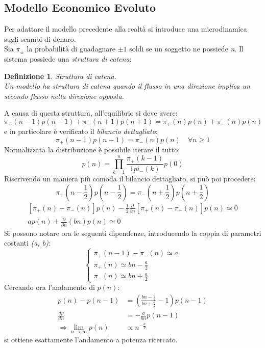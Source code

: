 \documentclass[12pt, a4paper]{article}
\theoremstyle{theorem}
\newtheorem{definition}{Definizione}[section]
\begin{document}
		\subsection{Modello Economico Evoluto}
			Per adattare il modello precedente alla realtà si introduce una microdinamica sugli scambi di denaro.\\
			Sia $\pi_\pm$ la probabilità di guadagnare $\pm 1$ soldi se un soggetto ne possiede \textit{n}. Il sistema possiede una \textit{struttura di catena}:
			\begin{definition}
				Struttura di catena.\\
				Un modello ha struttura di catena quando il flusso in una direzione implica un secondo flusso nella direzione opposta.
			\end{definition}
			A causa di questa struttura, all'equilibrio si deve avere:
			\begin{equation}
				\pi_+(n-1)p(n-1)+\pi_-(n+1)p(n+1)=\pi_+(n)p(n)+\pi_-(n)p(n)
			\end{equation}
			e in particolare è verificato il \textit{bilancio dettagliato}:
			\begin{equation}
				\pi_+(n-1)p(n-1)=\pi_-(n)p(n)\quad \forall n\geq 1
			\end{equation}
			Normalizzata la distribuzione è possibile iterare il tutto:
			\begin{equation}
				p(n)=\prod_{k=1}^n\frac{\pi_+(k-1)}{1pi_-(k)}p(0)
			\end{equation}
			Riscrivendo un maniera più comoda il bilancio dettagliato, si può poi procedere:
			\begin{equation}
				\pi_+(n-\frac{1}{2})p(n-\frac{1}{2})=\pi_-(n+\frac{1}{2})p(n+\frac{1}{2})
			\end{equation}
			\begin{equation}
				\begin{split}
					[\pi_+(n)-\pi_-(n)]p(n)-\frac{1}{2}\frac{\partial}{\partial n}[\pi_+(n)-\pi_-(n)]p(n)\simeq 0\\
					ap(n)+\frac{\partial}{\partial n}(bn)p(n)\simeq 0
				\end{split}
			\end{equation}
			Si possono notare ora le seguenti dipendenze, introducendo la coppia di parametri costanti \textit{(a, b)}:
			\begin{equation}
				\begin{cases}
					\pi_+(n-1)-\pi_-(n)\simeq a\\
					\pi_+(n)\simeq bn-\frac{a}{2}\\
					\pi_-(n)\simeq bn+\frac{a}{2}
				\end{cases}
			\end{equation}
			Cercando ora l'andamento di $p(n)$:
			\begin{equation}
				\begin{split}
					p(n)-p(n-1)&=\left(\frac{bn-\frac{a}{2}}{bn+\frac{a}{2}}-1\right)p(n-1)\\
					\frac{dp}{dn}&=-\frac{a}{bn}p(n-1)\\
					\Rightarrow\lim_{n\to\infty}p(n)&\propto n^{-\frac{a}{b}}
				\end{split}
			\end{equation}
			si ottiene esattamente l'andamento a potenza ricercato.
\end{document}

